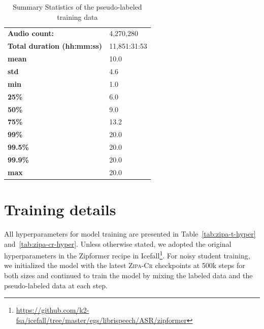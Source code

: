 \documentclass[11pt]{article}
\begin{document}
\begin{table}[ht]
\centering
\begin{tabular}{ll}
\toprule
\textbf{Audio count:}               & 4,270,280        \\
\textbf{Total duration (hh:mm:ss)}  & 11,851:31:53    \\ 
\textbf{mean}                       & 10.0           \\
\textbf{std}                        & 4.6            \\ 
\textbf{min}                        & 1.0            \\ 
\textbf{25\%}                       & 6.0            \\ 
\textbf{50\%}                       & 9.0            \\ 
\textbf{75\%}                       & 13.2           \\ 
\textbf{99\%}                       & 20.0           \\ 
\textbf{99.5\%}                     & 20.0           \\ 
\textbf{99.9\%}                     & 20.0           \\ 
\textbf{max}                        & 20.0           \\ 
\bottomrule
\end{tabular}
\caption{Summary Statistics of the pseudo-labeled training data}
\label{tab:pseudo-stats}
\end{table}



\section{Training details}
\label{app:training}

All hyperparameters for model training are presented in Table~\ref{tab:zipa-t-hyper} and~\ref{tab:zipa-cr-hyper}. Unless otherwise stated, we adopted the original hyperparameters in the Zipformer recipe in Icefall\footnote{\url{https://github.com/k2-fsa/icefall/tree/master/egs/librispeech/ASR/zipformer}}. For noisy student training, we initialized the model with the latest \textsc{Zipa-Cr} checkpoints at 500k steps for both sizes and continued to train the model by mixing the labeled data and the pseudo-labeled data at each step. 
\end{document}
